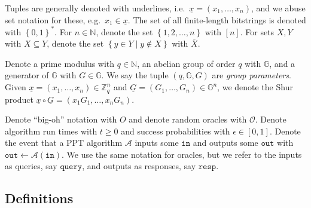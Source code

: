\documentclass[11pt]{article}
\theoremstyle{definition}
\newcommand{\G}{\mathbb{G}}
\newcommand{\bitstrings}{\left\{0,1\right\}^*}
\newcommand{\Zq}{\mathbb{Z}_q}
\newcommand{\bbn}{\mathbb{N}}
\newcommand{\keygen}{\texttt{KGen}}
\begin{document}



Tuples are generally denoted with underlines, i.e.\ $\underline{x} = (x_1, \ldots, x_n)$, and we abuse set notation for these, e.g.\ $x_1 \in \underline{x}$. The set of all finite-length bitstrings is denoted with $\bitstrings$.  For $n \in \bbn$, denote the set $\left\{1, 2, \ldots, n\right\}$ with $\left[n\right]$. For sets $X, Y$ with $X \subseteq Y$, denote the set $\left\{y \in Y \mid y \notin X\right\}$ with $\overline{X}$. 

Denote a prime modulus with $q \in \bbn$, an abelian group of order $q$ with $\G$, and a generator of $\G$ with $G \in \G$. We say the tuple $(q, \G, G)$ are \textit{group parameters}. Given $\underline{x} = (x_1, \ldots, x_n) \in \Zq^n$ and $\underline{G} = (G_1, \ldots, G_n) \in \G^n$, we denote the Shur product $\underline{x} \circ \underline{G} = (x_1G_1, \ldots, x_n G_n)$.


Denote ``big-oh'' notation with $O$ and denote random oracles with $\mathcal{O}$. Denote algorithm run times with $t \geq 0$ and success probabilities with $\epsilon \in [0,1]$. Denote the event that a PPT algorithm $\mathcal{A}$ inputs some $\texttt{in}$ and outputs some $\texttt{out}$ with $\texttt{out} \leftarrow \mathcal{A}(\texttt{in})$. We use the same notation for oracles, but we refer to the inputs as queries, say $\texttt{query}$, and outputs as responses, say $\texttt{resp}$.


\subsection{Definitions}\label{sec:definitions}
\end{document}
